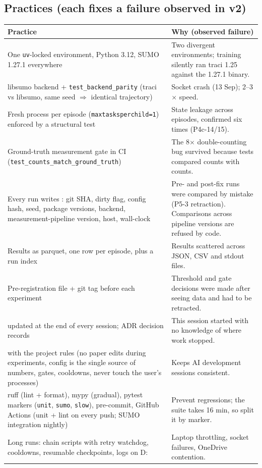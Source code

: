 \documentclass[11pt,a4paper]{article}
\newcommand{\file}[1]{\texttt{\detokenize{#1}}}
\begin{document}
\subsection{Practices (each fixes a failure observed in v2)}
\small
\begin{longtable}{@{}p{6.4cm}p{9.6cm}@{}}
\toprule
Practice & Why (observed failure) \\
\midrule
\endhead
One \texttt{uv}-locked environment, Python 3.12, SUMO 1.27.1 everywhere & Two divergent
  environments; training silently ran traci 1.25 against the 1.27.1 binary. \\
libsumo backend + \texttt{test\_backend\_parity} (traci vs libsumo, same seed $\Rightarrow$
  identical trajectory) & Socket crash (13 Sep); 2--3$\times$ speed. \\
Fresh process per episode (\texttt{maxtasksperchild=1}) enforced by a structural test &
  State leakage across episodes, confirmed six times (P4c-14/15). \\
Ground-truth measurement gate in CI (\texttt{test\_counts\_match\_ground\_truth}) &
  The 8$\times$ double-counting bug survived because tests compared counts with counts. \\
Every run writes \file{manifest.json}: git SHA, dirty flag, config hash, seed, package
  versions, backend, measurement-pipeline version, host, wall-clock & Pre- and post-fix
  runs were compared by mistake (P5-3 retraction). Comparisons across pipeline versions are
  refused by code. \\
Results as parquet, one row per episode, plus a run index & Results scattered across
  JSON, CSV and stdout files. \\
Pre-registration file + git tag before each experiment & Threshold and gate decisions were
  made after seeing data and had to be retracted. \\
\file{docs/STATUS.md} updated at the end of every session; ADR decision records & This
  session started with no knowledge of where work stopped. \\
\file{CLAUDE.md} with the project rules (no paper edits during experiments, config is the
  single source of numbers, gates, cooldowns, never touch the user's processes) & Keeps AI
  development sessions consistent. \\
ruff (lint + format), mypy (gradual), pytest markers (\texttt{unit}, \texttt{sumo},
  \texttt{slow}), pre-commit, GitHub Actions (unit + lint on every push; SUMO integration
  nightly) & Prevent regressions; the suite takes 16 min, so split it by marker. \\
Long runs: chain scripts with retry watchdog, cooldowns, resumable checkpoints, logs on D:
  & Laptop throttling, socket failures, OneDrive contention. \\
\bottomrule
\end{longtable}
\normalsize
\end{document}

